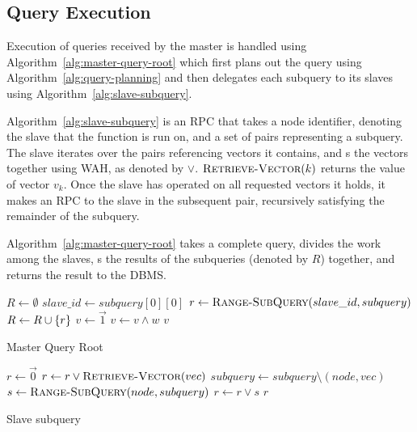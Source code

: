\subsection{Query Execution}
Execution of queries received by the master is handled using
Algorithm~\ref{alg:master-query-root} which first plans out the query using
Algorithm~\ref{alg:query-planning} and then delegates each subquery to its
slaves using Algorithm~\ref{alg:slave-subquery}.
\par
Algorithm~\ref{alg:slave-subquery} is an RPC that takes a node identifier,
denoting the slave that the function is run on, and a set of pairs
representing a subquery. The slave iterates over the pairs referencing vectors
it contains, and s the vectors together using WAH, as denoted by \(\lor\).
\(\mathrm{\textsc{Retrieve-Vector}}(k)\) returns the value of vector \(v_k\).
Once the slave has operated on all requested vectors it holds, it makes an RPC
to the slave in the subsequent pair, recursively satisfying the remainder of
the subquery.
\par
Algorithm~\ref{alg:master-query-root} takes a complete query, divides the work
among the slaves, s the results of the subqueries (denoted by
\(R\)) together, and returns the result to the DBMS.
%
\begin{algorithm}
    \begin{algorithmic}
            \State $R \gets \emptyset$
                \State $slave\_id \gets subquery[0][0]$
                \State $r \gets \Call{Range-SubQuery}{slave\_id, subquery}$
                \State $R \gets R \cup \left\{r\right\}$
            \EndFor
            \State $v \gets \vec{1}$
                \State $v \gets v \land w$
            \EndFor
            \State \Return $v$
        \EndProcedure
    \end{algorithmic}
    \caption{Master Query Root}
    \label{alg:master-query-root}
\end{algorithm}
%
\begin{algorithm}
    \begin{algorithmic}
            \State $r \gets \vec{0}$
                 
                    \State $r \gets r \lor \Call{Retrieve-Vector}{vec}$
                    \State $subquery \gets subquery \setminus (node, vec)$
                \Else {}
                    \State $s \gets \Call{Range-SubQuery}{node, subquery}$
                    \State $r \gets r \lor s$
                \EndIf
            \EndFor
            \State \Return $r$
        \EndProcedure
    \end{algorithmic}
    \caption{Slave subquery}
    \label{alg:slave-subquery}
\end{algorithm}
%
